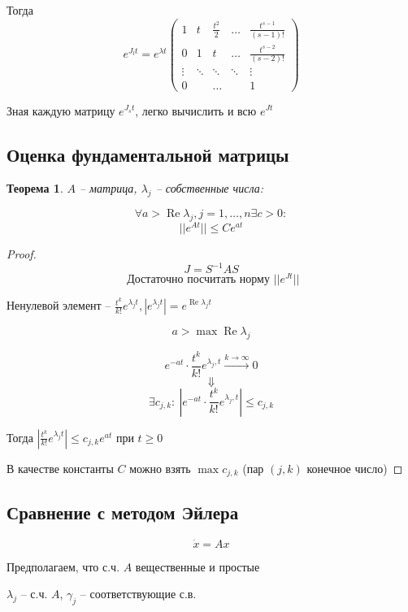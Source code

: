 \documentclass[a4paper]{article}
\theoremstyle{indented}
\newtheorem*{theorem}{Теорема}
\theoremstyle{definition}
\theoremstyle{remark}
\DeclareMathOperator{\Real}{Re}
\begin{document}
Тогда 
\[e^{J_lt} = e^{\lambda t}
  \begin{pmatrix}
      1 & t & \frac{t^2}{2} & \ldots & \frac{t^{s-1}}{(s-1)!} \\
      0 & 1 & t & \ldots & \frac{t^{s-2}}{(s-2)!}\\
      \vdots & \ddots & \ddots & \ddots & \vdots \\
      0 & & \ldots & & 1
    \end{pmatrix}\]

Зная каждую матрицу $e^{J_s t}$, легко вычислить и всю $e^{J t}$

\subsection{Оценка фундаментальной матрицы}

\begin{theorem}
  

$A$ -- матрица, $\lambda_j$ -- собственные числа:

\[\forall a > \Real \lambda_j, j = 1, \ldots , n \exists c > 0:
\]
\[||e^{At}|| \leqslant Ce^{at}\]
\end{theorem}
\begin{proof}
  \[J = S^{-1}AS\]
  \[\text{ Достаточно посчитать норму }||e^{Jt}||\]

  Ненулевой элемент -- $\frac{t^k}{k!}e^{\lambda_j t}, |e^{\lambda_j t}| = e^{\Real \lambda_j t}$

  $$a > \max \Real \lambda_j$$

  \[e^{-at} \cdot \frac{t^k}{k!}e^{\lambda_j,t} \xrightarrow{ k \to \infty} 0\]
  \[\Downarrow \]
  \[\exists c_{j,k}: \ |e^{-at} \cdot \frac{t^k}{k!}e^{\lambda_j,t} | \leqslant c_{j,k}\]

  Тогда $|\frac{t^k}{k!}e^{\lambda_j t}| \leqslant c_{j,k} e^{at}$ при $ t \geqslant 0$

  В качестве константы $C$ можно взять $\max c_{j,k}$ (пар $(j,k)$ конечное число)
\end{proof}

\subsection{Сравнение с методом Эйлера}

\[\dot x = Ax\]

Предполагаем, что с.ч. $A$ вещественные и простые

$\lambda_j$ -- с.ч. $A$, $\gamma_j$ -- соответствующие с.в.
\end{document}
